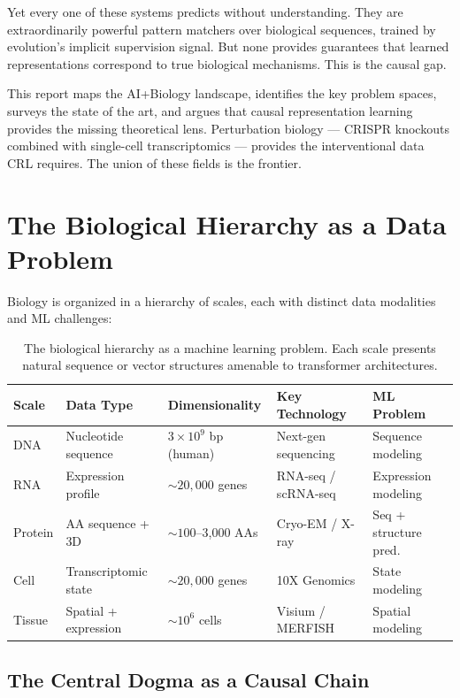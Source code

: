 \documentclass[11pt]{article}
\begin{document}
Yet every one of these systems predicts without understanding. They are extraordinarily powerful pattern matchers over biological sequences, trained by evolution's implicit supervision signal. But none provides guarantees that learned representations correspond to true biological mechanisms. This is the causal gap.

This report maps the AI+Biology landscape, identifies the key problem spaces, surveys the state of the art, and argues that causal representation learning \citep{scholkopf2021toward} provides the missing theoretical lens. Perturbation biology --- CRISPR knockouts combined with single-cell transcriptomics --- provides the interventional data CRL requires. The union of these fields is the frontier.

\section{The Biological Hierarchy as a Data Problem}

Biology is organized in a hierarchy of scales, each with distinct data modalities and ML challenges:

\begin{table}[h]
\centering
\begin{tabular}{lllll}
\toprule
\textbf{Scale} & \textbf{Data Type} & \textbf{Dimensionality} & \textbf{Key Technology} & \textbf{ML Problem} \\
\midrule
DNA & Nucleotide sequence & $3 \times 10^9$ bp (human) & Next-gen sequencing & Sequence modeling \\
RNA & Expression profile & $\sim 20{,}000$ genes & RNA-seq / scRNA-seq & Expression modeling \\
Protein & AA sequence + 3D & $\sim 100$--3,000 AAs & Cryo-EM / X-ray & Seq + structure pred. \\
Cell & Transcriptomic state & $\sim 20{,}000$ genes & 10X Genomics & State modeling \\
Tissue & Spatial + expression & $\sim 10^6$ cells & Visium / MERFISH & Spatial modeling \\
\bottomrule
\end{tabular}
\caption{The biological hierarchy as a machine learning problem. Each scale presents natural sequence or vector structures amenable to transformer architectures.}
\end{table}

\subsection{The Central Dogma as a Causal Chain}
\end{document}
